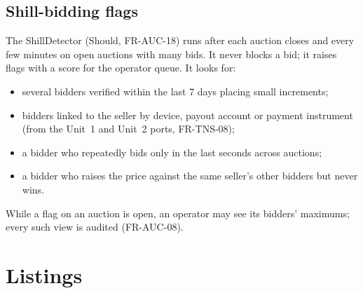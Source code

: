 \documentclass[11pt,a4paper]{article}
\begin{document}
\subsection{Shill-bidding flags}
\label{sec:shill}
The ShillDetector (Should, FR-AUC-18) runs after each auction closes and every few minutes on open auctions with many bids. It never blocks a bid; it raises flags with a score for the operator queue. It looks for:
\begin{itemize}[nosep]
  \item several bidders verified within the last 7 days placing small increments;
  \item bidders linked to the seller by device, payout account or payment instrument (from the Unit~1 and Unit~2 ports, FR-TNS-08);
  \item a bidder who repeatedly bids only in the last seconds across auctions;
  \item a bidder who raises the price against the same seller's other bidders but never wins.
\end{itemize}
While a flag on an auction is open, an operator may see its bidders' maximums; every such view is audited (FR-AUC-08).
\section{Listings}
\end{document}
